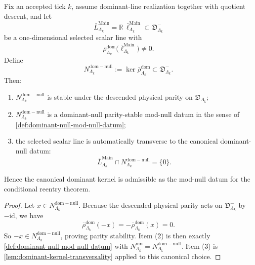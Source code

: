 \documentclass[11pt]{article}
\begin{document}
\begin{theorem}
\label{thm:canonical-dominant-null-datum}
Fix an accepted tick \(k\), assume dominant-line realization together with quotient descent, and let
\[
\overline L^{\mathrm{Main}}_{\Lambda_k}
=
\mathbb R\,\overline\ell^{\mathrm{Main}}_{\Lambda_k}
\subset
\mathfrak D^-_{\Lambda_k}
\]
be a one-dimensional selected scalar line with
\[
\overline{\rho}^{\mathrm{dom}}_{\Lambda_k}
\!\bigl(
\overline\ell^{\mathrm{Main}}_{\Lambda_k}
\bigr)
\neq 0.
\]
Define
\[
N^{\mathrm{dom-null}}_{\Lambda_k}
:=
\ker \overline{\rho}^{\mathrm{dom}}_{\Lambda_k}
\subset
\mathfrak D^-_{\Lambda_k}.
\]
Then:
\begin{enumerate}[leftmargin=2em]
\item \(N^{\mathrm{dom-null}}_{\Lambda_k}\) is stable under the descended physical parity on
  \(\mathfrak D^-_{\Lambda_k}\);
\item \(N^{\mathrm{dom-null}}_{\Lambda_k}\) is a dominant-null parity-stable mod-null datum in the
  sense of \cref{def:dominant-null-mod-null-datum};
\item the selected scalar line is automatically transverse to the canonical dominant-null datum:
  \[
  \overline L^{\mathrm{Main}}_{\Lambda_k}
  \cap
  N^{\mathrm{dom-null}}_{\Lambda_k}
  =
  \{0\}.
  \]
\end{enumerate}
Hence the canonical dominant kernel is admissible as the mod-null datum for the conditional
reentry theorem.
\end{theorem}

\begin{proof}
Let \(x\in N^{\mathrm{dom-null}}_{\Lambda_k}\).
Because the descended physical parity acts on \(\mathfrak D^-_{\Lambda_k}\) by \(-\mathrm{id}\),
we have
\[
\overline{\rho}^{\mathrm{dom}}_{\Lambda_k}(-x)
=
-\overline{\rho}^{\mathrm{dom}}_{\Lambda_k}(x)
=
0.
\]
So \(-x\in N^{\mathrm{dom-null}}_{\Lambda_k}\), proving parity stability.
Item \textnormal{(2)} is then exactly \cref{def:dominant-null-mod-null-datum} with
\(
N^{\mathrm{mn}}_{\Lambda_k}=N^{\mathrm{dom-null}}_{\Lambda_k}
\).
Item \textnormal{(3)} is \cref{lem:dominant-kernel-transversality} applied to this canonical
choice.
\end{proof}
\end{document}
